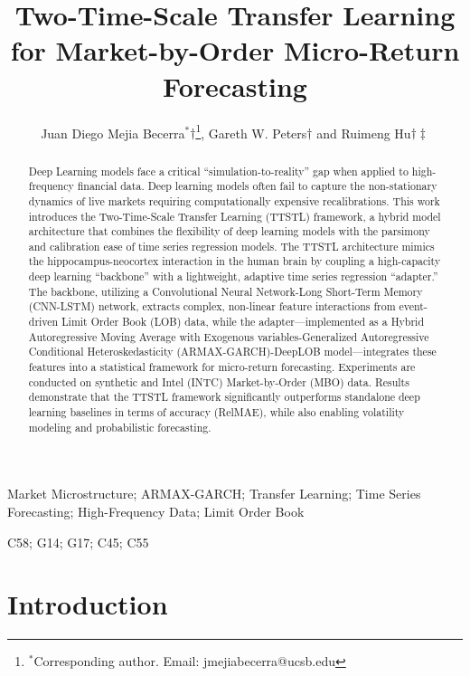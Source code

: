 \documentclass{rQUF2e}
\title{Two-Time-Scale Transfer Learning for Market-by-Order Micro-Return Forecasting}
\author{Juan Diego Mejia Becerra$^{\ast}$$\dag$\thanks{$^\ast$Corresponding author. Email: jmejiabecerra@ucsb.edu}, Gareth W. Peters$\dag$ and Ruimeng Hu$\dag\ddag$\\
\affil{$\dag$Department of Statistics and Applied Probability, University of California, Santa Barbara, CA, USA\\
$\ddag$Department of Mathematics, University of California, Santa Barbara, CA, USA}
\received{Received \today} }
\theoremstyle{plain}
\theoremstyle{definition}
\theoremstyle{remark}
\begin{document}

\maketitle
\linenumbers

\begin{abstract}
    Deep Learning models face a critical ``simulation-to-reality'' gap when applied to high-frequency financial data. Deep learning models often fail to capture the non-stationary dynamics of live markets requiring computationally expensive recalibrations. This work introduces the Two-Time-Scale Transfer Learning (TTSTL) framework, a hybrid model architecture that combines the flexibility of deep learning models with the parsimony and calibration ease of time series regression models. The TTSTL architecture mimics the hippocampus-neocortex interaction in the human brain by coupling a high-capacity deep learning ``backbone'' with a lightweight, adaptive time series regression ``adapter.'' The backbone, utilizing a Convolutional Neural Network-Long Short-Term Memory (CNN-LSTM) network, extracts complex, non-linear feature interactions from event-driven Limit Order Book (LOB) data, while the adapter—implemented as a Hybrid Autoregressive Moving Average with Exogenous variables-Generalized Autoregressive Conditional Heteroskedasticity (ARMAX-GARCH)-DeepLOB model—integrates these features into a statistical framework for micro-return forecasting. Experiments are conducted on synthetic and Intel (INTC) Market-by-Order (MBO) data. Results demonstrate that the TTSTL framework significantly outperforms standalone deep learning baselines in terms of accuracy (RelMAE), while also enabling volatility modeling and probabilistic forecasting.
\end{abstract}

\begin{keywords}
Market Microstructure; ARMAX-GARCH; Transfer Learning; Time Series Forecasting; High-Frequency Data; Limit Order Book
\end{keywords}

\begin{classcode}C58; G14; G17; C45; C55\end{classcode}

\section{Introduction}
\label{Sect:Intro}
\end{document}
